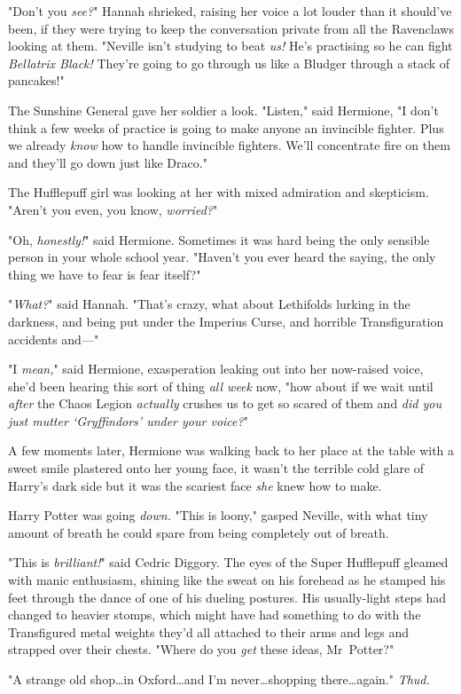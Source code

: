 "Don’t you \emph{see?}" Hannah shrieked, raising her voice a lot louder than it
should’ve been, if they were trying to keep the conversation private from all
the Ravenclaws looking at them. "Neville isn’t studying to beat \emph{us!} He’s
practising so he can fight \emph{Bellatrix Black!} They’re going to go through
us like a Bludger through a stack of pancakes!"

The Sunshine General gave her soldier a look. "Listen," said Hermione, "I don’t
think a few weeks of practice is going to make anyone an invincible fighter.
Plus we already \emph{know} how to handle invincible fighters. We’ll
concentrate fire on them and they’ll go down just like Draco."

The Hufflepuff girl was looking at her with mixed admiration and skepticism.
"Aren’t you even, you know, \emph{worried?}"

"Oh, \emph{honestly!}" said Hermione. Sometimes it was hard being the only
sensible person in your whole school year. "Haven’t you ever heard the saying,
the only thing we have to fear is fear itself?"

"\emph{What?}" said Hannah. "That’s crazy, what about Lethifolds lurking in the
darkness, and being put under the Imperius Curse, and horrible Transfiguration
accidents and—"

"I \emph{mean,}" said Hermione, exasperation leaking out into her now-raised
voice, she’d been hearing this sort of thing \emph{all week} now, "how about if
we wait until \emph{after} the Chaos Legion \emph{actually} crushes us to get
so scared of them and \emph{did you just mutter ‘Gryffindors’ under your
voice?}"

A few moments later, Hermione was walking back to her place at the table with a
sweet smile plastered onto her young face, it wasn’t the terrible cold glare of
Harry’s dark side but it was the scariest face \emph{she} knew how to make.

Harry Potter was going \emph{down.}
\later
"This is loony," gasped Neville, with what tiny amount of breath he could spare
from being completely out of breath.

"This is \emph{brilliant!}" said Cedric Diggory. The eyes of the Super
Hufflepuff gleamed with manic enthusiasm, shining like the sweat on his
forehead as he stamped his feet through the dance of one of his dueling
postures. His usually-light steps had changed to heavier stomps, which might
have had something to do with the Transfigured metal weights they’d all
attached to their arms and legs and strapped over their chests. "Where do you
\emph{get} these ideas, Mr~Potter?"

"A strange old shop…in Oxford…and I’m never…shopping
there…again." \emph{Thud.}
